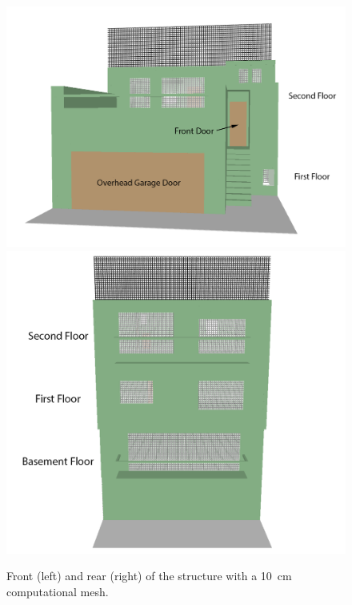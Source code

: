 \documentclass[12pt,oneside]{book}
\begin{document}
\begin{figure}[!ht]
\includegraphics[width=5.0in]{../Figures/SMV_Exterior_Grid_Front} \\
\includegraphics[width=5.0in]{../Figures/SMV_Exterior_Grid_Rear}
\caption{Front (left) and rear (right) of the structure with a 10~cm computational mesh.}
\label{fig:SMV_exterior_grid}
\end{figure}
\end{document}
